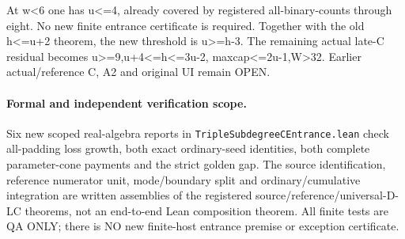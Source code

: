 At w<6 one has u<=4, already covered by registered all-binary-counts
through eight. No new finite entrance certificate is required. Together
with the old h<=u+2 theorem, the new threshold is u>=h-3.
The remaining actual late-C residual becomes u>=9,u+4<=h<=3u-2,
maxcap<=2u-1,W>32. Earlier actual/reference C, A2 and original UI remain OPEN.

\paragraph{Formal and independent verification scope.}
Six new scoped real-algebra reports in \texttt{TripleSubdegreeCEntrance.lean}
check all-padding loss growth, both exact ordinary-seed identities,
both complete parameter-cone payments and the strict golden gap.
The source identification, reference numerator unit, mode/boundary
split and ordinary/cumulative integration are written assemblies
of the registered source/reference/universal-D-LC theorems, not an
end-to-end Lean composition theorem. All finite tests are QA ONLY;
there is NO new finite-host entrance premise or exception certificate.
